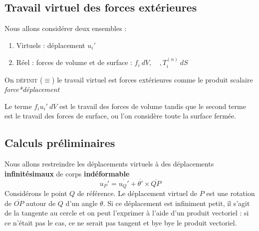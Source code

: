 	
	\subsection{Travail virtuel des forces extérieures}
	Nous allons considérer deux ensembles :
	\begin{enumerate}
	\item Virtuels : déplacement $u_i'$
	\item Réel : forces de volume et de surface : $f_i\ dV,\quad, T_i^{(n)}\ dS$
	\end{enumerate}
	On \textsc{définit} ($\equiv$) le travail virtuel est forces extérieures comme 
	le produit scalaire \textit{force*déplacement}
	\ 
	
	Le terme $f_iu_i'\ dV$ est le travail des forces de volume tandis que le second 
	terme est le travail des forces de surface, ou l'on considère toute la surface 
	fermée.


	\subsection{Calculs préliminaires}
	Nous allons restreindre les déplacements virtuels à des déplacements 
	\textbf{infinitésimaux} de corps \textbf{indéformable} 
	\begin{equation}
	\overline{u_P'} = \overline{u_Q'} + \overline{\theta'}\times\overline{QP}
	\end{equation}
	Considérons le point $Q$ de référence. Le déplacement virtuel de $P$ est 
	une rotation de $\overline{OP}$ autour de $Q$ d'un angle $\theta$. Si 
	ce déplacement est infiniment petit, il s'agit de la tangente au cercle et 
	on peut l'exprimer à l'aide d'un produit vectoriel : si ce n'était pas le 
	cas, ce ne serait pas tangent et bye bye le produit vectoriel.\\
	
